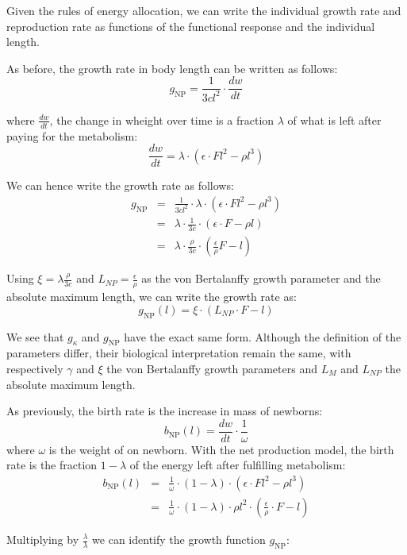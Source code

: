 Given the rules of energy allocation, we can write the individual
growth rate and reproduction rate as functions of the functional response
and the individual length.

As before, the growth rate in body length can be written as follows:
\[
g_{\text{NP}}=\frac{1}{3cl^{2}}\cdot\frac{dw}{dt}
\]


where $\frac{dw}{dt}$, the change in wheight over time is a fraction
$\lambda$ of what is left after paying for the metabolism: 
\[
\frac{dw}{dt}=\lambda\cdot\left(\epsilon\cdot Fl^{2}-\rho l^{3}\right)
\]


We can hence write the growth rate as follows:
\begin{eqnarray*}
g_{\text{NP}} & = & \frac{1}{3cl^{2}}\cdot\lambda\cdot\left(\epsilon\cdot Fl^{2}-\rho l^{3}\right)\\
 & = & \lambda\cdot\frac{1}{3c}\cdot\left(\epsilon\cdot F-\rho l\right)\\
 & = & \lambda\cdot\frac{\rho}{3c}\cdot\left(\frac{\epsilon}{\rho}F-l\right)
\end{eqnarray*}


Using ${\displaystyle \xi=\lambda\frac{\rho}{3c}}$ and ${\displaystyle L_{NP}=\frac{\epsilon}{\rho}}$
as the von Bertalanffy growth parameter and the absolute maximum length,
we can write the growth rate as:
\[
g_{\text{NP}}(l)=\xi\cdot\left(L_{NP}\cdot F-l\right)
\]


We see that $g_{\kappa}$ and $g_{\text{NP}}$ have the exact same
form. Although the definition of the parameters differ, their biological
interpretation remain the same, with respectively $\gamma$ and $\xi$
the von Bertalanffy growth parameters and $L_{M}$ and $L_{NP}$ the
absolute maximum length. 

As previously, the birth rate is the increase in mass of newborns:
\[
b_{\text{NP}}(l)=\frac{dw}{dt}\cdot\frac{1}{\omega}
\]
where $\omega$ is the weight of on newborn. With the net production
model, the birth rate is the fraction $1-\lambda$ of the energy left
after fulfilling metabolism:
\begin{eqnarray*}
b_{\text{NP}}(l) & = & \frac{1}{\omega}\cdot(1-\lambda)\cdot\left(\epsilon\cdot Fl^{2}-\rho l^{3}\right)\\
 & = & \frac{1}{\omega}\cdot(1-\lambda)\cdot\rho l^{2}\cdot\left(\frac{\epsilon}{\rho}\cdot F-l\right)
\end{eqnarray*}


Multiplying by $\frac{\lambda}{\lambda}$ we can identify the growth
function $g_{\text{NP}}$:

